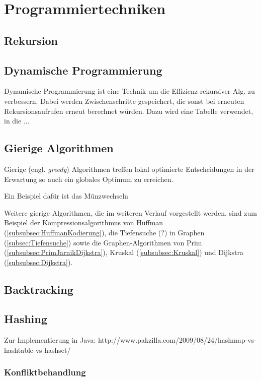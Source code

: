 \section{Programmiertechniken}
\label{sec:Programmiertechniken}
%
%
\subsection{Rekursion}
\label{subsec:Rekursion}

%
%
\subsection{Dynamische Programmierung}
\label{subsec:DynamischeProgrammierung}
Dynamische Programmierung ist eine Technik um die Effizienz rekursiver Alg. zu verbessern.
Dabei werden Zwischenschritte gespeichert, die sonst bei erneuten Rekursionsaufrufen erneut berechnet würden.
Dazu wird eine Tabelle verwendet, in die ...

%
%
\subsection{Gierige Algorithmen}
\label{subsec:GierigeAlgorithmen}

Gierige (engl. \textit{greedy}) Algorithmen treffen lokal optimierte Entscheidungen in der Erwartung so auch ein globales Optimum zu erreichen.

Ein Beispiel dafür ist das Münzwechseln

Weitere gierige Algorithmen, die im weiteren Verlauf vorgestellt werden, sind zum Beispiel
der Kompressionsalgorithmus von Huffman (\ref{subsubsec:HuffmanKodierung}),
die Tiefensuche (?) in Graphen (\ref{subsec:Tiefensuche}) sowie
die Graphen-Algorithmen von Prim (\ref{subsubsec:PrimJarnikDijkstra}),
Kruskal (\ref{subsubsec:Kruskal}) und Dijkstra (\ref{subsubsec:Dijkstra}).


%
%
\subsection{Backtracking}
\label{subsec:Backtracking}

%
%
\subsection{Hashing}
\label{subsec:Hashing}
Zur Implementierung in Java:
http://www.pakzilla.com/2009/08/24/hashmap-vs-hashtable-vs-hashset/

\subsubsection{Konfliktbehandlung}

